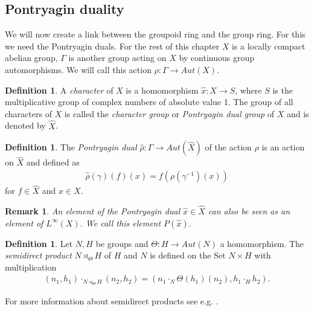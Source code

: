 \documentclass[12pt,a4paper]{scrartcl}
\theoremstyle{plain}
\newtheorem{Remark}[Theorem]{Remark}
\theoremstyle{definition}
\newtheorem{Definition}[Theorem]{Definition}
\numberwithin{equation}{section}
\newcommand{\2}{\mathbb{Z} / 2 \mathbb{Z}}
\newcommand{\1}{\bar{1}}
\newcommand{\0}{\bar{0}}
\begin{document}
\subsection{Pontryagin duality}
We will now create a link between the groupoid ring and the group ring. For this we need the Pontryagin duals. For the rest of this chapter $X$ is a locally compact abelian group, $\Gamma$ is another group acting on $X$ by continuous group automorphisms. We will call this action $\rho: \Gamma \to Aut(X)$.
\begin{Definition}
	A \emph{character} of $X$ is a homomorphism $\hat{x}: X \to S$, where $S$ is the multiplicative group of complex numbers of absolute value 1. The group of all characters of $X$ is called the \emph{character group} or \emph{Pontryagin dual group} of $X$ and is denoted by $\hat{X}$.
\end{Definition}
\begin{Definition}
	The \emph{Pontryagin dual} $\hat{\rho}:\Gamma \to Aut(\hat{X})$ of the action $\rho$ is an action on $\hat{X}$ and defined as
	\begin{align*}
		\hat{\rho}(\gamma)(f)(x) = f(\rho(\gamma^{-1})(x))
	\end{align*}
	for $f \in \hat{X}$ and $x \in X$.
\end{Definition}
\begin{Remark}
	An element of the Pontryagin dual $\hat{x} \in \hat{X}$ can also be seen as an element of $L^{\infty}(X)$. We call this element $P(\hat{x})$.
\end{Remark}
\begin{Definition}
	Let $N, H$ be groups and $\Theta : H \to Aut(N)$ a homomorphism. The \emph{semidirect product} $N \rtimes_\Theta H$ of $H$ and $N$ is defined on the Set $N \times H$ with multiplication 
	\begin{align*}
		(n_1, h_1) \cdot_{N \rtimes_\Theta H} (n_2, h_2) = (n_1 \cdot_N \Theta(h_1)(n_2), h_1 \cdot_H h_2).
	\end{align*}
\end{Definition}

For more information about semidirect products see e.g. \cite{ALG}.
\end{document}
